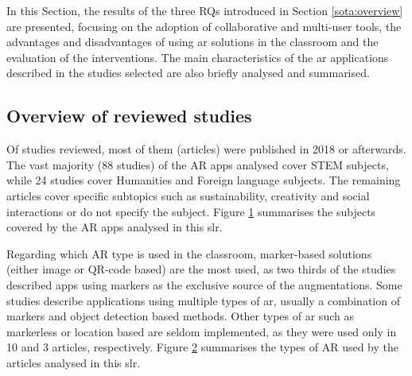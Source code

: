 In this Section, the results of the three \glspl{RQ} introduced in Section \ref{sota:overview} are presented, focusing on the adoption of collaborative and multi-user tools, the advantages and disadvantages of using \gls{ar} solutions in the classroom and the evaluation of the interventions. The main characteristics of the \gls{ar} applications described in the studies selected are also briefly analysed and summarised.

\subsection{Overview of reviewed studies}

Of \papersSelected studies reviewed, most of them (\papersAfterTwentyEighteen articles) were published in 2018 or afterwards. The vast majority (88 studies) of the AR apps analysed cover STEM subjects, while 24 studies cover Humanities and Foreign language subjects. The remaining articles cover specific subtopics such as sustainability, creativity and social interactions or do not specify the subject. Figure \ref{fig:subjects} summarises the subjects covered by the AR apps analysed in this \gls{slr}.

\begin{figure}[htbp]	
	\begin{center}
	
	\captionsetup{font=small}
	\caption{\fontsize{10pt}{11pt}}
	\label{fig:subjects}
    \end{center}
\end{figure}


Regarding which AR type is used in the classroom, marker-based solutions (either image or QR-code based) are the most used, as two thirds of the studies described apps using markers as the exclusive source of the augmentations. 
Some studies describe applications using multiple types of \gls{ar}, usually a combination of markers and object detection based methods. Other types of \gls{ar} such as markerless or location based are seldom implemented, as they were used only in 10 and 3 articles, respectively. Figure \ref{fig:artech} summarises the types of AR used by the articles analysed in this \gls{slr}.

\begin{figure}[htbp]	
	\begin{center}
	
	\captionsetup{font=small}
	\caption{\fontsize{10pt}{11pt}}
	\label{fig:artech}
    \end{center}
\end{figure}

